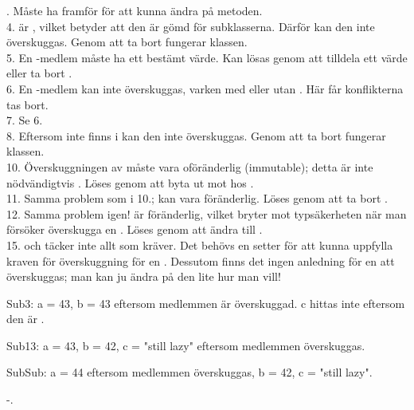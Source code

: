 \SOLUTION


\TaskSolved \what


. Måste ha  framför  för att kunna ändra på metoden. \\
4.  är , vilket betyder att den är gömd för subklasserna. Därför kan den inte överskuggas. Genom att ta bort  fungerar klassen. \\
5. En -medlem måste ha ett bestämt värde. Kan lösas genom att tilldela  ett värde eller ta bort . \\
6. En -medlem kan inte överskuggas, varken med eller utan . Här får konflikterna tas bort.  \\
7. Se 6. \\
8. Eftersom  inte finns i  kan den inte överskuggas. Genom att ta bort  fungerar klassen. \\
10. Överskuggningen av  måste vara oföränderlig (immutable); detta är inte nödvändigtvis . Löses genom att byta ut  mot  hos .  \\
11. Samma problem som i 10.;  kan vara föränderlig. Löses genom att ta bort . \\
12. Samma problem igen!  är föränderlig, vilket bryter mot typsäkerheten när man försöker överskugga en . Löses genom att ändra  till . \\
15. och  täcker inte allt som  kräver. Det behövs en setter för att kunna uppfylla kraven för överskuggning för en . Dessutom finns det ingen anledning för en  att överskuggas; man kan ju ändra på den lite hur man vill!

\SubtaskSolved  Sub3: a = 43, b = 43 eftersom medlemmen är överskuggad. c hittas inte eftersom den är .

Sub13: a = 43, b = 42, c = "still lazy" eftersom medlemmen överskuggas.

SubSub: a = 44 eftersom medlemmen överskuggas, b = 42, c = "still lazy".

\SubtaskSolved  -.


\QUESTEND





\AdvancedTasks %




